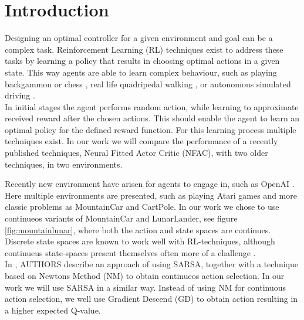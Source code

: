 
\section{Introduction}

Designing an optimal controller for a given environment and goal can be a complex task. Reinforcement Learning (RL) techniques exist to address these tasks by learning a policy that results in choosing optimal actions in a given state. This way agents are able to learn complex behaviour, such as playing backgammon \cite{tesauro2002programming} or chess \cite{baxter1999knightcap},
real life quadripedal walking \cite{kohl2004policy}, or autonomous simulated driving \cite{}. \\  %


In initial stages the agent performs random action, while learning to approximate received reward after the chosen actions. This should enable the agent to learn an optimal policy for the defined reward function. For this learning process multiple techniques exist. In our work we will compare the performance of a recently published techniques, Neural Fitted Actor Critic (NFAC), with two older techniques, in two environments.

Recently new environment have arisen for agents to engage in, such as OpenAI \cite{REFERENCE}. Here multiple environments are presented, such as playing Atari games and more classic problems as MountainCar and CartPole. In our work we chose to use continueos variants of MountainCar and LunarLander, see figure \ref{fig:mountainlunar}, where both the action and state spaces are continues. 
Discrete state spaces are known to work well with RL-techniques, although continueus state-spaces present themselves often more of a challenge \cite{TODO}. \\

In \cite{sarsaNMpapaer}, AUTHORS describe an approach of using SARSA, together with a technique based on Newtons Method (NM) to obtain continueos action selection. 
In our work we will use SARSA in a similar way. Instead of using NM for continuous action selection, we well use Gradient Descend (GD) to obtain action resulting in a higher expected Q-value.






